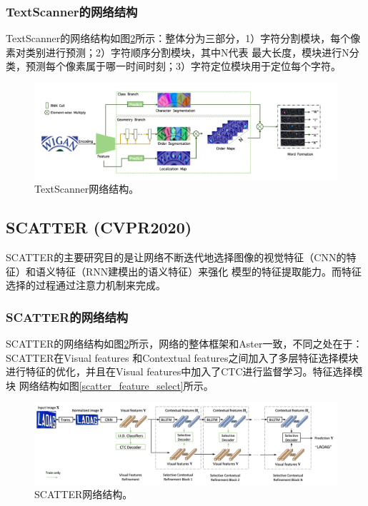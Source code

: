 \subsubsection{TextScanner的网络结构}
TextScanner的网络结构如图\ref{scatter_framework}所示：整体分为三部分，1）字符分割模块，每个像素对类别进行预测；2）字符顺序分割模块，其中N代表
最大长度，模块进行N分类，预测每个像素属于哪一时间时刻；3）字符定位模块用于定位每个字符。
\begin{figure}[H]
    \centering
    \includegraphics[width=.98\textwidth]{figure/recognition/textscanner_framework.png} 
    \caption{TextScanner网络结构。} 
    \label{textscanner_framework} 
\end{figure}

\subsection{SCATTER (CVPR2020)}
SCATTER\cite{scatter}的主要研究目的是让网络不断迭代地选择图像的视觉特征（CNN的特征）和语义特征（RNN建模出的语义特征）来强化
模型的特征提取能力。而特征选择的过程通过注意力机制来完成。
\subsubsection{SCATTER的网络结构}
SCATTER的网络结构如图\ref{scatter_framework}所示，网络的整体框架和Aster一致，不同之处在于：SCATTER在Visual features
和Contextual features之间加入了多层特征选择模块进行特征的优化，并且在Visual features中加入了CTC进行监督学习。特征选择模块
网络结构如图\ref{scatter_feature_select}所示。
\begin{figure}[H]
    \centering
    \includegraphics[width=.98\textwidth]{figure/recognition/scatter_framework.png} 
    \caption{SCATTER网络结构。} 
    \label{scatter_framework} 
\end{figure}

